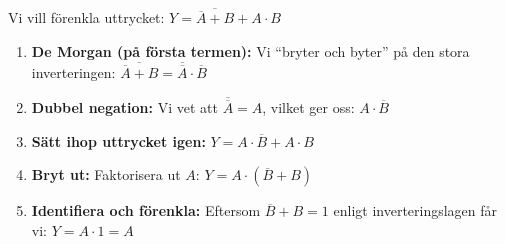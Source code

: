 \documentclass[
  swedish,
  letterpaper,
  oneside,
  openany]{book}
\begin{document}
\begin{tcolorbox}[enhanced jigsaw, arc=.35mm, bottomrule=.15mm, bottomtitle=1mm, breakable, colback=white, colbacktitle=quarto-callout-note-color!10!white, colframe=quarto-callout-note-color-frame, coltitle=black, left=2mm, leftrule=.75mm, opacityback=0, opacitybacktitle=0.6, rightrule=.15mm, title=\textcolor{quarto-callout-note-color}{\faInfo}\hspace{0.5em}{Exempel: Ytterligare exempel med De Morgan}, titlerule=0mm, toprule=.15mm, toptitle=1mm]

Vi vill förenkla uttrycket:
\(Y = \overline{\overline{A} + B} + A \cdot B\)

\begin{enumerate}
\def\labelenumi{\arabic{enumi}.}
\item
  \textbf{De Morgan (på första termen):} Vi ``bryter och byter'' på den
  stora inverteringen:
  \(\overline{\overline{A} + B} = \overline{\overline{A}} \cdot \overline{B}\)
\item
  \textbf{Dubbel negation:} Vi vet att \(\overline{\overline{A}} = A\),
  vilket ger oss: \(A \cdot \overline{B}\)
\item
  \textbf{Sätt ihop uttrycket igen:}
  \(Y = A \cdot \overline{B} + A \cdot B\)
\item
  \textbf{Bryt ut:} Faktorisera ut \(A\):
  \(Y = A \cdot (\overline{B} + B)\)
\item
  \textbf{Identifiera och förenkla:} Eftersom \(\overline{B} + B = 1\)
  enligt inverteringslagen får vi: \(Y = A \cdot 1 = A\)
\end{enumerate}

\end{tcolorbox}
\end{document}
